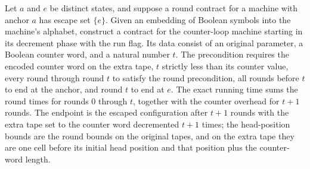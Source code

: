 \begin{definition}
\label{Turing.RoundContract.counterLoopEscape}
\leanok
{}
Let $a$ and $e$ be distinct states, and suppose a round contract for a machine with
anchor $a$ has escape set $\{e\}$. Given an embedding of Boolean symbols into the
machine's alphabet, construct a contract for the counter-loop machine starting in its
decrement phase with the run flag. Its data consist of an original parameter, a Boolean
counter word, and a natural number $t$. The precondition requires the encoded counter
word on the extra tape, $t$ strictly less than its counter value, every round through
round $t$ to satisfy the round precondition, all rounds before $t$ to end at the anchor,
and round $t$ to end at $e$. The exact running time sums the round times for rounds $0$
through $t$, together with the counter overhead for $t+1$ rounds. The endpoint is the
escaped configuration after $t+1$ rounds with the extra tape set to the counter word
decremented $t+1$ times; the head-position bounds are the round bounds on the original
tapes, and on the extra tape they are one cell before its initial head position and that
position plus the counter-word length.
\end{definition}

